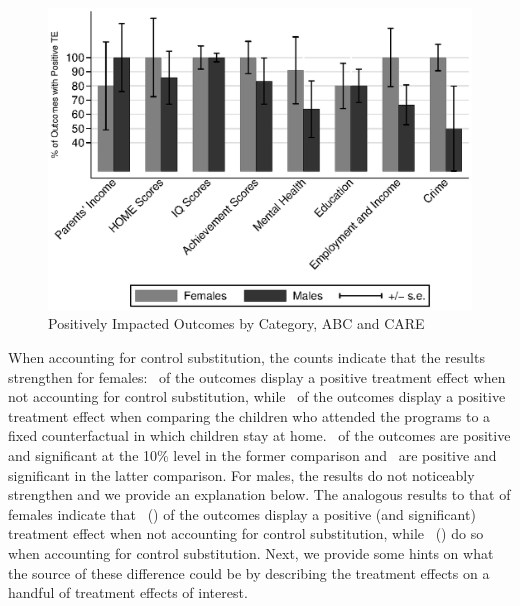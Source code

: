 \begin{figure}[H]
		\caption{Positively Impacted Outcomes by Category, ABC and CARE} \label{fig:ppositivecategory1}
		\includegraphics[width=.9\columnwidth]{output/itt_noctrl_cats1.eps}
\end{figure}

\noindent When accounting for control substitution, the counts indicate that the results strengthen for females: \positivef\ of the outcomes display a positive treatment effect when not accounting for control substitution, while \positivecsf\ of the outcomes display a positive treatment effect when comparing the children who attended the programs to a fixed counterfactual in which children stay at home. \positivesm\ of the outcomes are positive and significant at the 10\% level in the former comparison and \positivescsf\ are positive and significant in the latter comparison. For males, the results do not noticeably strengthen and we provide an explanation below. The analogous results to that of females indicate that  \positivem\ (\positivesm) of the outcomes display a positive (and significant) treatment effect when not accounting for control substitution, while \positivecsm\ (\positivescsm) do so when accounting for control substitution. Next, we provide some hints on what the source of these difference could be by describing the treatment effects on a handful of treatment effects of interest.

